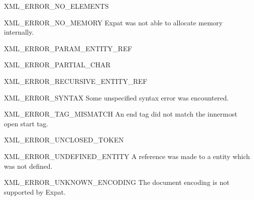 \begin{datadesc}{XML_ERROR_NO_ELEMENTS}
\end{datadesc}

\begin{datadesc}{XML_ERROR_NO_MEMORY}
Expat was not able to allocate memory internally.
\end{datadesc}

\begin{datadesc}{XML_ERROR_PARAM_ENTITY_REF}
\end{datadesc}

\begin{datadesc}{XML_ERROR_PARTIAL_CHAR}
\end{datadesc}

\begin{datadesc}{XML_ERROR_RECURSIVE_ENTITY_REF}
\end{datadesc}

\begin{datadesc}{XML_ERROR_SYNTAX}
Some unspecified syntax error was encountered.
\end{datadesc}

\begin{datadesc}{XML_ERROR_TAG_MISMATCH}
An end tag did not match the innermost open start tag.
\end{datadesc}

\begin{datadesc}{XML_ERROR_UNCLOSED_TOKEN}
\end{datadesc}

\begin{datadesc}{XML_ERROR_UNDEFINED_ENTITY}
A reference was made to a entity which was not defined.
\end{datadesc}

\begin{datadesc}{XML_ERROR_UNKNOWN_ENCODING}
The document encoding is not supported by Expat.
\end{datadesc}


